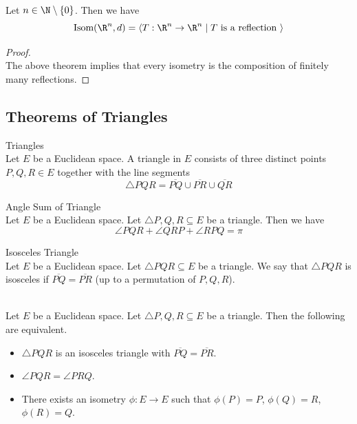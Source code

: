 \documentclass[a4paper]{article}
\begin{document}
\begin{crl}{}{}\\
Let $n\in\N\setminus\{0\}$. Then we have $$\text{Isom}(\R^n,d)=\langle T:\R^n\to\R^n\;|\;T\text{ is a reflection }\rangle$$
\begin{proof}\\
The above theorem implies that every isometry is the composition of finitely many reflections. 
\end{proof}
\end{crl}

\subsection{Theorems of Triangles}
\begin{defn}{Triangles}{}\\
Let $E$ be a Euclidean space. A triangle in $E$ consists of three distinct points $P,Q,R\in E$ together with the line segments $$\triangle PQR=\overline{PQ}\cup\overline{PR}\cup\overline{QR}$$
\end{defn}

\begin{thm}{Angle Sum of Triangle}{}\\
Let $E$ be a Euclidean space. Let $\triangle P,Q,R\subseteq E$ be a triangle. Then we have $$\angle PQR+\angle QRP+\angle RPQ=\pi$$
\end{thm}

\begin{defn}{Isosceles Triangle}{}\\
Let $E$ be a Euclidean space. Let $\triangle PQR\subseteq E$ be a triangle. We say that $\triangle PQR$ is isosceles if $\overline{PQ}=\overline{PR}$ (up to a permutation of $P,Q,R$). 
\end{defn}

\begin{prp}{}{}\\
Let $E$ be a Euclidean space. Let $\triangle P,Q,R\subseteq E$ be a triangle. Then the following are equivalent. 
\begin{itemize}
\item $\triangle PQR$ is an isosceles triangle with $\overline{PQ}=\overline{PR}$. 
\item $\angle PQR=\angle PRQ$. 
\item There exists an isometry $\phi:E\to E$ such that $\phi(P)=P$, $\phi(Q)=R$, $\phi(R)=Q$. 
\end{itemize}
\end{prp}
\end{document}
